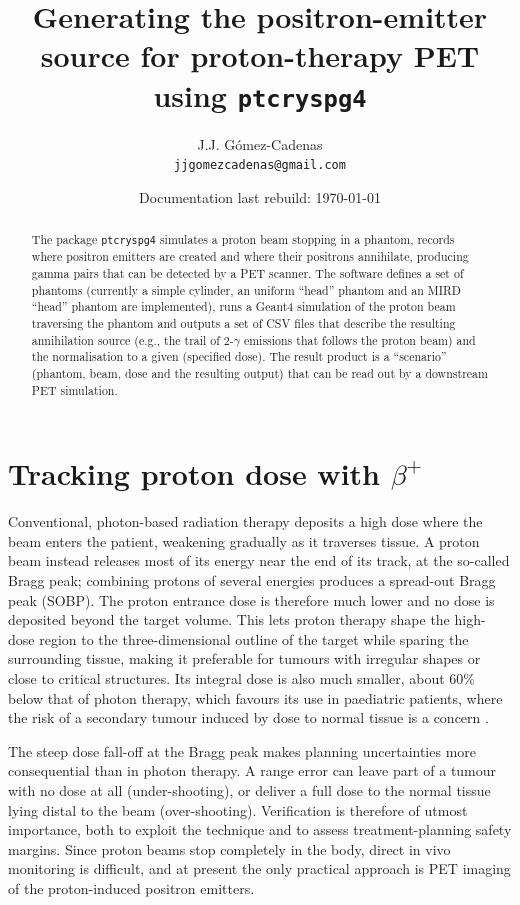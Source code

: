 \documentclass[11pt]{article}
\title{Generating the positron-emitter source for proton-therapy PET using \texttt{ptcryspg4}}
\author{J.J. G\'omez-Cadenas\\\texttt{jjgomezcadenas@gmail.com}}
\date{Documentation last rebuild: \today}
\newcommand{\bplus}{\beta^{+}}
\begin{document}
\maketitle

\begin{abstract}
The package \texttt{ptcryspg4} simulates a proton beam stopping in a phantom,
records where positron emitters are created and where their positrons annihilate,
producing gamma pairs that can be detected by a PET scanner. The software defines a set of phantoms (currently a simple cylinder, an uniform ``head'' phantom and an MIRD ``head'' phantom are implemented), runs a Geant4 simulation of the proton beam traversing the phantom and outputs a set of CSV files that describe the resulting annihilation source (e.g., the trail of 2-$\gamma$ emissions that follows the proton beam) and the normalisation to a given (specified dose).  The result product is a ``scenario'' (phantom, beam, dose and the resulting output) that can be read out by a downstream PET simulation. 
\end{abstract}

\section{Tracking proton dose with \texorpdfstring{$\bplus$}{beta+}}
\label{sec:physics-intro}

Conventional, photon-based radiation therapy deposits a high dose where the beam enters the patient, weakening gradually as it traverses tissue. A proton beam instead releases most of its energy near the end of its track, at the so-called Bragg peak; combining protons of several energies produces a spread-out Bragg peak (SOBP). The proton entrance dose is therefore much lower and no dose is deposited beyond the target volume. This lets proton therapy shape the high-dose region to the three-dimensional outline of the target while sparing the surrounding tissue, making it preferable for tumours with irregular shapes or close to critical structures. Its integral dose is also much smaller, about 60\% below that of photon therapy, which favours its use in paediatric patients, where the risk of a secondary tumour induced by dose to normal tissue is a concern \cite{parodi2023, 
parodi2024}.

The steep dose fall-off at the Bragg peak makes planning uncertainties more consequential than in photon therapy. A range error can leave part of a tumour with no dose at all (under-shooting), or deliver a full dose to the normal tissue lying distal to the beam (over-shooting). Verification is therefore of utmost importance, both to exploit the technique and to assess treatment-planning safety margins. Since proton beams stop completely in the body, direct in vivo monitoring is difficult, and at present the only practical approach is PET imaging of the proton-induced positron emitters.
\end{document}

